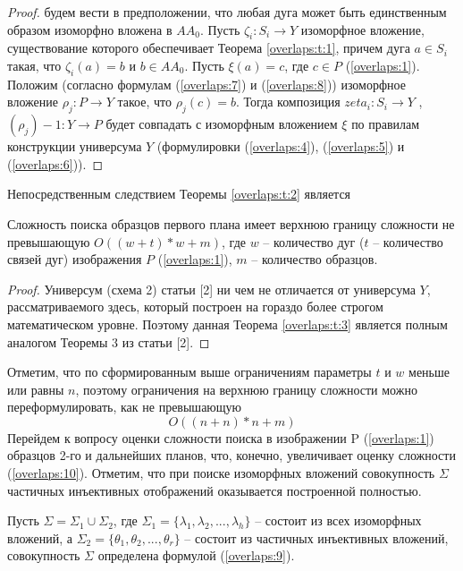 \begin{proof}
будем вести в предположении, что любая дуга  может быть единственным образом изоморфно вложена в  $AA_0$. Пусть $\zeta_i : S_i  \to Y$ изоморфное вложение, существование которого  обеспечивает Теорема \ref{overlaps:t:1}, причем дуга $a \in S_i$ такая, что $\zeta_i (a) = b$  и   $b \in AA_0$.  Пусть $\xi(a) = c$,  где  $c \in P$  (\ref{overlaps:1}).  
Положим  (согласно формулам (\ref{overlaps:7})  и  (\ref{overlaps:8}))  изоморфное вложение $\rho_j : P \to Y$  такое, что  $\rho_j (c) = b$. Тогда   композиция  $zeta_i : S_i \to Y$ , $(\rho_j)-1 : Y \to P$  будет  совпадать с  изоморфным вложением $\xi$ по правилам конструкции универсума  $Y$  (формулировки   (\ref{overlaps:4}), (\ref{overlaps:5}) и  (\ref{overlaps:6})).
\end{proof}

Непосредственным следствием Теоремы \ref{overlaps:t:2} является

\begin{theorem}
Сложность поиска образцов первого плана имеет верхнюю границу сложности не превышающую  $O((w+t)*w+m)$,  где  $w$ -- количество дуг ($t$ -- количество связей дуг) изображения  $P$  (\ref{overlaps:1}), $m$ -- количество образцов.
\label{overlaps:t:3}
\end{theorem}
\begin{proof}
Универсум (схема 2) статьи [2] ни чем не отличается от универсума  $Y$, рассматриваемого здесь, который построен на гораздо более строгом математическом уровне. Поэтому данная Теорема \ref{overlaps:t:3}  является полным аналогом Теоремы 3 из статьи [2].
\end{proof}

Отметим, что по сформированным выше ограничениям параметры  $t$  и $w$  меньше или равны $n$,  поэтому  ограничения на верхнюю границу сложности можно переформулировать, как не превышающую  
\begin{equation}
O((n+n)*n+m)
\label{overlaps:10}
\end{equation}
Перейдем к вопросу оценки сложности поиска в  изображении  P  (\ref{overlaps:1})  образцов 2-го и дальнейших планов, что, конечно, увеличивает оценку сложности (\ref{overlaps:10}).  Отметим, что при поиске изоморфных вложений совокупность $\Sigma$ частичных инъективных отображений  оказывается построенной полностью.

Пусть $\Sigma = \Sigma_1 \cup \Sigma_2$, где $\Sigma_1  =  \{\lambda_1, \lambda_2 ,... , \lambda_h \}$ -- состоит из всех изоморфных вложений,  а  $\Sigma_2  =  \{\theta_1, \theta_2 ,..., \theta_r\}$ -- состоит из частичных инъективных вложений, совокупность  $\Sigma$  определена формулой (\ref{overlaps:9}).  

